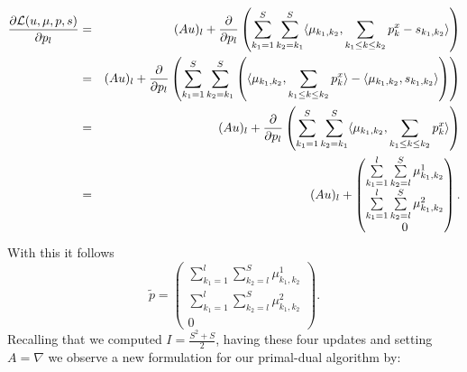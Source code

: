 \documentclass[abstracton]{scrreprt}
\begin{document}
            \begin{eqnarray}
                \frac{\partial \mathcal{L}(u, \mu, p, s)}{\partial p_{l}} &=& (Au)_{l} + \frac{\partial}{\partial p_{l}} \left(\sum_{k_{1} = 1}^{S} \sum_{k_{2} = k_{1}}^{S} \langle \mu_{k_{1}, k_{2}}, \sum_{k_{1} \le k \le k_{2}} p^{x}_{k} - s_{k_{1}, k_{2}} \rangle \right) \notag \\
                &=& (Au)_{l} + \frac{\partial}{\partial p_{l}} \left(\sum_{k_{1} = 1}^{S} \sum_{k_{2} = k_{1}}^{S} \left( \langle \mu_{k_{1}, k_{2}}, \sum_{k_{1} \le k \le k_{2}} p^{x}_{k} \rangle - \langle \mu_{k_{1}, k_{2}}, s_{k_{1}, k_{2}} \rangle \right) \right) \notag \\
                &=& (Au)_{l} + \frac{\partial}{\partial p_{l}} \left(\sum_{k_{1} = 1}^{S} \sum_{k_{2} = k_{1}}^{S} \langle \mu_{k_{1}, k_{2}}, \sum_{k_{1} \le k \le k_{2}} p^{x}_{k} \rangle \right) \notag \\
                &=& (Au)_{l} + 
                    \begin{pmatrix}
                        \sum\limits_{k_{1} = 1}^{l} \sum\limits_{k_{2} = l}^{S} \mu_{k_{1}, k_{2}}^{1} \\
                        \sum\limits_{k_{1} = 1}^{l} \sum\limits_{k_{2} = l}^{S} \mu_{k_{1}, k_{2}}^{2} \\
                        0
                    \end{pmatrix}.\notag
            \end{eqnarray}
        With this it follows
            $$
                \tilde{p} =
                    \begin{pmatrix}
                        \sum\limits_{k_{1} = 1}^{l} \sum\limits_{k_{2} = l}^{S} \mu_{k_{1}, k_{2}}^{1} \\
                        \sum\limits_{k_{1} = 1}^{l} \sum\limits_{k_{2} = l}^{S} \mu_{k_{1}, k_{2}}^{2} \\
                        0
                    \end{pmatrix}.
            $$
        Recalling that we computed $I = \frac{S^{2} + S}{2}$, having these four updates and setting $A = \nabla$ we observe a new formulation for our primal-dual algorithm by:
\end{document}
